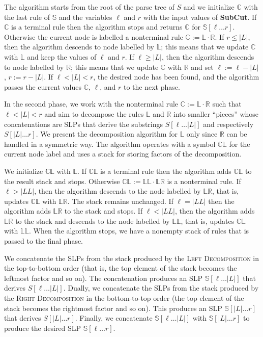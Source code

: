 \documentclass[11pt]{article}
\theoremstyle{break}
\newcommand{\slp}[1]{\mathbb{#1}}
\newcommand{\substr}[2]{[#1\dots#2]}
\begin{document}
\smallskip

 The algorithm starts from the root of the parse tree of $S$ and we initialize $\slp{C}$ with the last rule of
$\slp{S}$ and the variables $\ell$ and $r$ with the input values of \textbf{SubCut}. If $\slp{C}$ is a terminal rule then the algorithm
stops and returns $\slp{C}$ for $\slp{S}\substr{\ell}{r}$. Otherwise the current node is labelled a nonterminal rule $\slp{C}:= \slp{L}
\cdot \slp{R}$. If $r \le |L|$, then the algorithm descends to node labelled by $\slp{L}$; this means that we update $\slp{C}$ with
$\slp{L}$ and keep the values of $\ell$ and $r$. If $\ell\ge|L|$, then the algorithm descends to node labelled by $\slp{R}$; this means
that we update $\slp{C}$ with $\slp{R}$ and set $\ell := \ell - |L|$, $r := r - |L|$. If $\ell < |L| < r$, the desired node has been found,
and the algorithm passes the current values $\slp{C}$, $\ell$, and $r$ to the next phase.

\smallskip

In the second phase, we work with the nonterminal rule $\slp{C}:= \slp{L} \cdot \slp{R}$ such that $\ell < |L| < r$ and aim to decompose
the rules $\slp{L}$ and $\slp{R}$ into smaller ``pieces'' whose concatenations are SLPs that derive the substrings $S\substr{\ell}{|L|}$
and respectively $S\substr{|L|}{r}$. We present the decomposition algorithm for $\slp{L}$ only since $\slp{R}$ can be handled in a
symmetric way. The algorithm operates with a symbol $\slp{CL}$ for the current node label and uses a stack for storing factors of the
decomposition.

\smallskip

 We initialize $\slp{CL}$ with $\slp{L}$. If $\slp{CL}$ is a terminal rule then the algorithm adds
$\slp{CL}$ to the result stack and stops. Otherwise $\slp{CL}:= \slp{LL} \cdot \slp{LR}$ is a nonterminal rule. If $\ell > |LL|$, then the
algorithm descends to the node labelled by $\slp{LR}$, that is, updates $\slp{CL}$ with $\slp{LR}$. The stack remains unchanged. If $\ell =
|LL|$ then the algorithm adds $\slp{LR}$ to the stack and stops. If $\ell < |LL|$, then the algorithm adds $\slp{LR}$ to the stack and
descends to the node labelled by $\slp{LL}$, that is, updates $\slp{CL}$ with $\slp{LL}$. When the algorithm stops, we have a nonempty
stack of rules that is passed to the final phase.

\smallskip

 We concatenate the SLPs from the stack produced by the \textsc{Left Decomposition} in the top-to-bottom
order (that is, the top element of the stack becomes the leftmost factor and so on). The concatenation produces an SLP
$\slp{S}\substr{\ell}{|L|}$ that derives $S\substr{\ell}{|L|}$. Dually, we concatenate the SLPs from the stack produced by the
\textsc{Right Decomposition} in the bottom-to-top order (the top element of the stack becomes the rightmost factor and so on). This
produces an SLP $\slp{S}\substr{|L|}{r}$ that derives $S\substr{|L|}{r}$. Finally, we concatenate $\slp{S}\substr{\ell}{|L|}$ with
$\slp{S}\substr{|L|}{r}$ to produce the desired SLP $\slp{S}\substr{\ell}{r}$.
\end{document}
